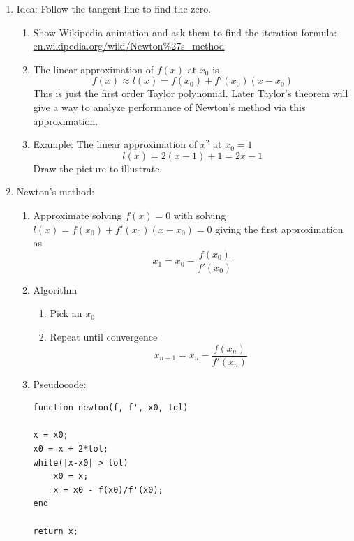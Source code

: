 \documentclass{article}
\theoremstyle{remark}
\begin{document}
\begin{enumerate}
\item Idea: Follow the tangent line to find the zero.
\begin{enumerate}

\item Show Wikipedia animation and ask them to find the iteration formula: \url{en.wikipedia.org/wiki/Newton%27s_method}

\item The linear approximation of $f(x)$ at $x_0$ is
\[
f(x) \approx l(x) = f(x_0)+f'(x_0)(x-x_0)
\]
This is just the first order Taylor polynomial. Later Taylor's theorem will give a way to analyze performance of Newton's method via this approximation.
\item Example: The linear approximation of $x^2$ at $x_0=1$
$$
l(x) = 2(x-1)+1 = 2x-1
$$
Draw the picture to illustrate.
\end{enumerate}


\item Newton's method:
\begin{enumerate}
\item Approximate solving $f(x) = 0$ with solving $l(x) = f(x_0)+f'(x_0)(x-x_0) = 0$ giving the first approximation as
\[
x_1 = x_0 - \frac{f(x_0)}{f'(x_0)}
\]
\item Algorithm
\begin{enumerate}
\item Pick an $x_0$
\item Repeat until convergence
$$
x_{n+1} = x_n-\frac{f(x_n)}{f'(x_n)}
$$
\end{enumerate}
\item Pseudocode:
\begin{verbatim}
function newton(f, f', x0, tol)

x = x0;
x0 = x + 2*tol;
while(|x-x0| > tol)
    x0 = x;
    x = x0 - f(x0)/f'(x0);
end

return x;
\end{verbatim}

\end{enumerate}



\end{enumerate}
\end{document}
